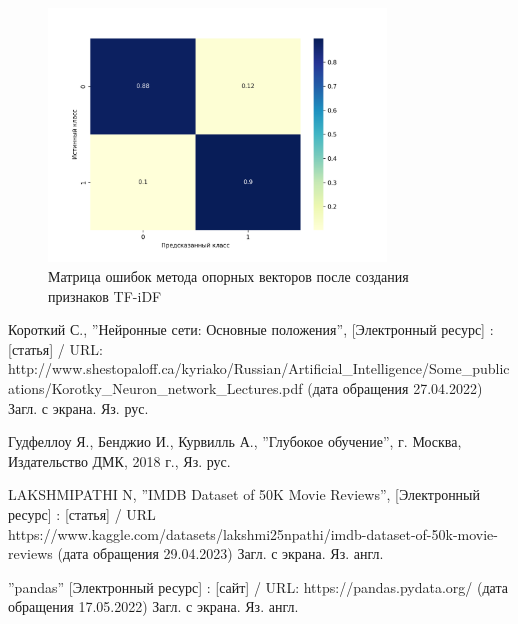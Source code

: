 \documentclass[bachelor, och, coursework]{SCWorks}
\begin{document}
        \begin{figure}[H]
            \centering
            \includegraphics[width=0.8\textwidth]{pic/TFIDF-SVM.png}
            \caption{Матрица ошибок метода опорных векторов после создания признаков TF-iDF}
        \end{figure}

\conclusion

\begin{thebibliography}{99}
     Короткий С., ''Нейронные сети: Основные положения'',
    [Электронный ресурс] : [статья] / URL:
    http://www.shestopaloff.ca/kyriako/Russian/Artificial_Intelligence/Some_publications/Korotky_Neuron_network_Lectures.pdf
    (дата обращения 27.04.2022) Загл. с экрана. Яз. рус.
    
     Гудфеллоу Я., Бенджио И., Курвилль А., ''Глубокое обучение'',
    г. Москва, Издательство ДМК, 2018 г., Яз. рус.
    
     LAKSHMIPATHI N, ''IMDB Dataset of 50K Movie Reviews'',
    [Электронный ресурс] : [статья] / URL
    https://www.kaggle.com/datasets/lakshmi25npathi/imdb-dataset-of-50k-movie-reviews
    (дата обращения 29.04.2023) Загл. с экрана. Яз. англ.



     ''pandas'' [Электронный ресурс] : [сайт] / URL:
    https://pandas.pydata.org/ (дата обращения 17.05.2022) Загл. с экрана. Яз.
    англ.

\end{thebibliography}

\appendix




\end{document}
